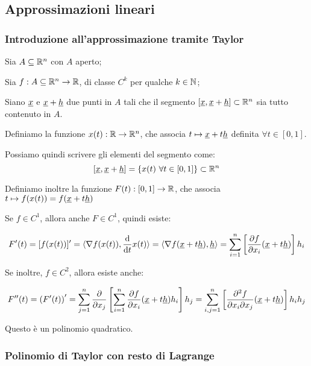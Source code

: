 \subsection{Approssimazioni lineari}

\subsubsection{Introduzione all'approssimazione tramite Taylor}

Sia \(A \subseteq \mathbb{R}^{n} \) con \(A\) aperto;

Sia \(f: A \subseteq \mathbb{R}^{n} \rightarrow \mathbb{R} \), di classe \(C^{k}\) per qualche \(k \in \mathbb{N} \);

Siano \(\underline{x} \) e \(\underline{x} +\underline{h} \) due punti in \(A\) tali che il segmento \([\underline{x}, \underline{x} +\underline{h} ] \subset \mathbb{R}^{n} \) sia tutto contenuto in \(A\).

Definiamo la funzione \(x(t) : \mathbb{R} \to \mathbb{R}^{n} \), che associa \(t \mapsto \underline{x}+t\underline{h} \) definita \(\forall t \in [0,1]\).

Possiamo quindi scrivere gli elementi del segmento come:
\[
    [\underline{x} , \underline{x} +\underline{h} ] = \{x(t) ~\forall t \in [0,1]\} \subset \mathbb{R}^{n}
\]

Definiamo inoltre la funzione \(F(t) : [0,1] \to \mathbb{R} \), che associa \(t \mapsto f(x(t)) = f(\underline{x}+t\underline{h})\)

Se \(f \in C^{1}\), allora anche \(F \in C^1\), quindi esiste:

\[
    F'(t) = [f(x(t))]' = \langle\nabla f(x(t)),\frac{\mathop{}\!\mathrm{d} }{\mathop{}\!\mathrm{d} t}x(t)\rangle = \langle\nabla f(\underline{x}+t\underline{h}),\underline{h}\rangle = \sum^{n}_{i=1} \left[ \frac{\partial f}{\partial x_i} (\underline{x} + t\underline{h} ) \right] h_i
\]

Se inoltre, \(f \in C^{2}\), allora esiste anche:

\[
    F''(t) = \left( F'(t) \right)' = \sum^{n}_{j=1} \frac{\partial}{\partial x_j} \left[ \sum^{n}_{i=1} \frac{\partial f}{\partial x_i}(\underline{x} + t\underline{h} ) h_i \right] h_j = \sum^{n}_{i,j=1} \left[ \frac{\partial^{2} f}{\partial x_i \partial x_j} (\underline{x} +  t\underline{h} ) \right] h_i h_j
\]

Questo è un polinomio quadratico.

\pagebreak
\subsubsection{Polinomio di Taylor con resto di Lagrange}

